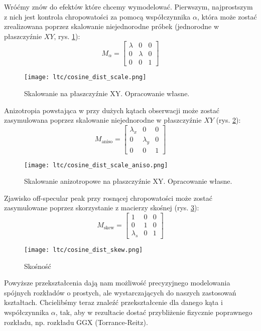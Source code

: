\documentclass[../main.tex]{subfiles}
\begin{document}
Wróćmy znów do efektów które chcemy wymodelować. Pierwszym, najprostszym z nich jest kontrola chropowatości za pomocą
współczynnika $\alpha$, która może zostać zrealizowana poprzez skalowanie
niejednorodne próbek (jednorodne w płaszczyźnie $XY$, rys. \ref{fig:LTCEqualScale}):
\[
M_{\alpha} =
\begin{bmatrix}
  \lambda & 0 & 0 \\
  0 & \lambda & 0 \\
  0 & 0 & 1
\end{bmatrix}
\]

\begin{figure}[h]
  \centering
  \texttt{[image: ltc/cosine\_dist\_scale.png]}
  \caption{Skalowanie na płaszczyźnie XY. Opracowanie własne.}
  \label{fig:LTCEqualScale}
\end{figure}

Anizotropia powstająca w przy dużych kątach obserwacji może zostać zasymulowana poprzez skalowanie niejednorodne w płaszczyźnie $XY$ (rys. \ref{fig:LTCAnisoScale}):
\[
M_{\text{aniso}} =
\begin{bmatrix}
  \lambda_x & 0 & 0 \\
  0 & \lambda_y & 0 \\
  0 & 0 & 1
\end{bmatrix}
\]

\begin{figure}[h]
  \centering
  \texttt{[image: ltc/cosine\_dist\_scale\_aniso.png]}
  \caption{Skalowanie anizotropowe na płaszczyźnie XY. Opracowanie własne.}
  \label{fig:LTCAnisoScale}
\end{figure}

Zjawisko off-specular peak przy rosnącej chropowatości może zostać zasymulowane poprzez skorzystanie z macierzy skośnej (rys. \ref{fig:LTCSkew}):
\[
M_{\text{skew}} =
\begin{bmatrix}
  1 & 0 & 0 \\
  0 & 1 & 0 \\
  \lambda_{s} & 0 & 1
\end{bmatrix}
\]

\begin{figure}[h]
  \centering
  \texttt{[image: ltc/cosine\_dist\_skew.png]}
  \caption{Skośność}
  \label{fig:LTCSkew}
\end{figure}

Powyższe przekształcenia dają nam możliwość precyzyjnego modelowania
spójnych rozkładów o prostych, ale wystarczających do naszych zastosowań
kształtach. Chcielibśmy teraz znaleźć przekształcenie dla danego kąta
i współczynnika $\alpha$, tak, aby w rezultacie dostać przybliżenie
fizycznie poprawnego rozkładu, np. rozkładu GGX (Torrance-Reitz).
\end{document}
